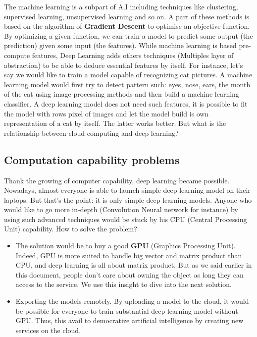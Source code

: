 The machine learning is a subpart of A.I including techniques like clustering, supervised learning, unsupervised learning and so on. A part of these methods is based on the algorithm of \textbf{Gradient Descent} to optimise an objective function. By optimizing a given function, we can train a model to predict some output (the prediction) given some input (the features). While machine learning is based pre-compute features, Deep Learning adds others techniques (Multiples layer of abstraction) to be able to deduce essential features by itself. For instance, let’s say we would like to train a model capable of recognizing cat pictures. A machine learning model would first try to detect pattern such: eyes, nose, ears, the month of the cat using image processing methods and then build a machine learning classifier. A deep learning model does not need such features, it is possible to fit the model with rows pixel of images and let the model build is own representation of a cat by itself. The latter works better. But what is the relationship between cloud computing and deep learning?

\subsection{Computation capability problems}

Thank the growing of computer capability, deep learning became possible. Nowadays, almost everyone is able to launch simple deep learning model on their laptops. But that’s the point: it is only simple deep learning models. Anyone who would like to go more in-depth (Convolution Neural network for instance) by using such advanced techniques would be stuck by his CPU (Central Processing Unit) capability. How to solve the problem?

\begin{itemize}
    \item The solution would be to buy a good \textbf{GPU} (Graphics Processing Unit). Indeed, GPU is more suited to handle big vector and matrix product than CPU, and deep learning is all about matrix product. But as we said earlier in this document, people don’t care about owning the object as long they can access to the service. We use this insight to dive into the next solution.
    \item Exporting the models remotely. By uploading a model to the cloud, it would be possible for everyone to train substantial deep learning model without GPU. Thus, this avail to democratize artificial intelligence by creating new services on the cloud.
\end{itemize}

